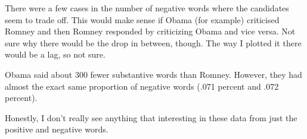 \documentclass[12pt,letterpaper]{article}
\begin{document}
There were a few cases in the number of negative words where the candidates seem to trade off. This would make sense if Obama (for example) criticised Romney and then Romney responded by criticizing Obama and vice versa. Not sure why there would be the drop in between, though. The way I plotted it there would be a lag, so not sure. 

Obama said about 300 fewer substantive words than Romney. However, they had almost the exact same proportion of negative words (.071 percent and .072 percent).

Honestly, I don't really see anything that interesting in these data from just the positive and negative words.
\end{document}

